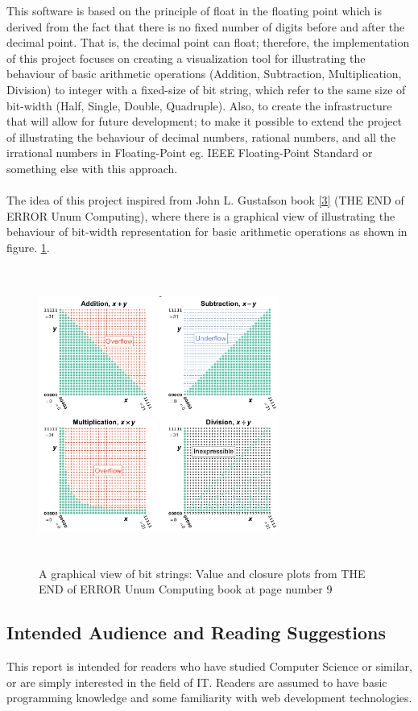 \documentclass[11pt]{article}
\begin{document}
This software is based on the principle of float in the floating point which is derived from the fact that there is no fixed number of digits before and after the decimal point. That is, the decimal point can float; therefore, the implementation of this project focuses on creating a visualization tool for illustrating the behaviour of basic arithmetic operations (Addition, Subtraction, Multiplication, Division) to integer with a fixed-size of bit string, which refer to the same size of bit-width (Half, Single, Double, Quadruple). Also, to create the infrastructure that will allow for future development; to make it possible to extend the project of illustrating the behaviour of decimal numbers, rational numbers, and all the irrational numbers in Floating-Point eg. IEEE Floating-Point Standard or something else with this approach.\\
\\The idea of this project inspired from John L. Gustafson book \ref{3} (THE END of ERROR Unum Computing), where there is a graphical view of illustrating the behaviour of bit-width representation for basic arithmetic operations as shown in figure. \ref{book}.\\
\begin{figure}[h]
    \centering
    \includegraphics[height=9.7cm,width=0.7\textwidth]{book}
    \caption{A graphical view of bit strings: Value and closure plots from THE END of ERROR Unum Computing book at page number 9}
    \label{book}
\end{figure}
\newpage
\subsection{Intended Audience and Reading Suggestions}
This report is intended for readers who have studied Computer Science or similar, or are simply interested in the field of IT. Readers are assumed to have basic programming knowledge and some familiarity with web development technologies.
\end{document}
